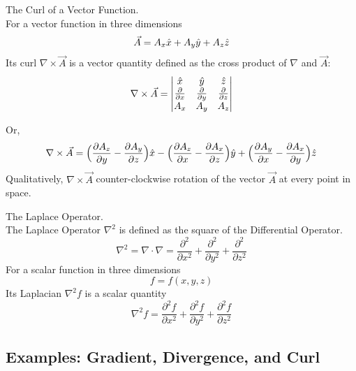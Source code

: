 \documentclass[11pt]{article}
\theoremstyle{gangnamstyle}{\newtheorem{definition}{Definition}[]}
\theoremstyle{gangnamstyle}{\newtheorem{example}{Example}[]}
\theoremstyle{gangnamstyle}{\newtheorem{problem}{Problem}[]}
\begin{document}
\begin{definition}
The Curl of a Vector Function. \\
For a vector function in three dimensions
\begin{equation}
\Vec{A} = A_x\Hat{x} + A_y\Hat{y} + A_z\Hat{z}
\end{equation}
Its curl $\nabla \times \Vec{A}$ is a vector quantity defined as the cross product of $\nabla$ and $\Vec{A}$: 
\begin{equation}
\nabla \times \Vec{A} = 
\begin{vmatrix}
\Hat{x} & \Hat{y} & \Hat{z} \\
\frac{\partial }{\partial x} & \frac{\partial }{\partial y} & \frac{\partial }{\partial z} \\
A_x & A_y & A_z
\end{vmatrix}
\end{equation}

Or, 
\[ \nabla \times \Vec{A} = \Bigl(\frac{\partial A_z}{\partial y} - \frac{\partial A_y}{\partial z}\Bigr)\Hat{x} - \Bigl(\frac{\partial A_z}{\partial x} - \frac{\partial A_x}{\partial z}\Bigr)\Hat{y} + \Bigl(\frac{\partial A_y}{\partial x} - \frac{\partial A_x}{\partial y}\Bigr)\Hat{z} \]
Qualitatively, $\nabla \times \Vec{A}$ counter-clockwise rotation of the vector $\Vec{A}$ at every point in space. 
\end{definition}

\begin{definition}
The Laplace Operator. \\
The Laplace Operator $\nabla^2$ is defined as the square of the Differential Operator. 
\begin{equation}
\nabla^2 = \nabla \cdot \nabla = \frac{\partial^2}{\partial x^2} + \frac{\partial^2}{\partial y^2} + \frac{\partial^2}{\partial z^2}
\end{equation}
For a scalar function in three dimensions
\begin{equation}
f = f(x, y, z)
\end{equation}
Its Laplacian $\nabla^2 f$ is a scalar quantity
\begin{equation}
\nabla^2 f = \frac{\partial^2f}{\partial x^2} + \frac{\partial^2f}{\partial y^2} + \frac{\partial^2f}{\partial z^2}
\end{equation}
\end{definition}

\subsection{Examples: Gradient, Divergence, and Curl}
\end{document}
